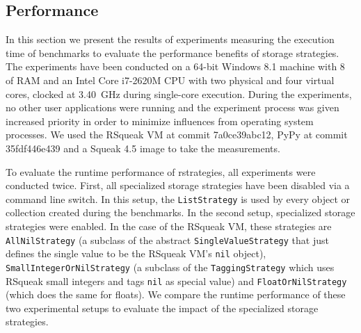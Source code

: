 \documentclass[english,10pt]{sigplanconf}
\begin{document}
\subsection{Performance}

In this section we present the results of experiments measuring the execution
time of benchmarks to evaluate the performance benefits of storage strategies.
The experiments have been conducted on a 64-bit Windows 8.1 machine with
\SI{8}{\giga\byte} of RAM and an Intel Core i7-2620M CPU with two physical and
four virtual cores, clocked at \SI{3.40}{\giga\Hz} during single-core
execution. During the experiments, no other user applications were running and
the experiment process was given increased priority in order to minimize
influences from operating system processes. We used the RSqueak VM at commit
7a0ce39abc12, PyPy at commit 35fdf446e439 and a Squeak 4.5 image to
take the measurements.

To evaluate the runtime performance of rstrategies, all experiments
were conducted twice.  First, all specialized storage strategies have
been disabled via a command line switch.  In this setup, the
\lstinline{ListStrategy} is used by every object or collection created
during the benchmarks.  In the second setup, specialized storage
strategies were enabled.  In the case of the RSqueak VM, these
strategies are \lstinline{AllNilStrategy} (a subclass of the abstract
\lstinline{SingleValueStrategy} that just defines the single value to
be the RSqueak VM's \lstinline{nil} object),
\lstinline{SmallIntegerOrNilStrategy} (a subclass of the
\lstinline{TaggingStrategy} which uses RSqueak small integers and tags
\lstinline{nil} as special value) and \lstinline{FloatOrNilStrategy}
(which does the same for floats).  We compare the runtime performance
of these two experimental setups to evaluate the impact of the
specialized storage strategies.  
\end{document}
